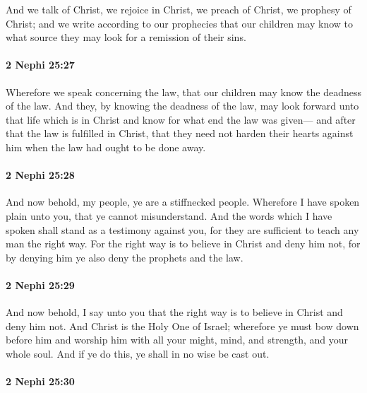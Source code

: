			And we talk of Christ,
			we rejoice in Christ,
			we preach of Christ,
			we prophesy of Christ;
			and we write according to our prophecies
			that our children may know to what source they may look
			for a remission of their sins.

		\paragraph{2 Nephi 25:27} %
			\label{2NEPHI-25-27}

			Wherefore we speak concerning the law,
			that our children may know the deadness of the law.
			And they, by knowing the deadness of the law,
			may look forward unto that life which is in Christ
			and know for what end the law was given---
			and after that the law is fulfilled in Christ,
			that they need not harden their hearts against him
			when the law had ought to be done away.

		\paragraph{2 Nephi 25:28} %
			\label{2NEPHI-25-28}

			And now behold, my people, ye are a stiffnecked people.
			Wherefore I have spoken plain unto you,
			that ye cannot misunderstand.
			And the words which I have spoken shall stand as a testimony against you,
			for they are sufficient to teach any man the right way.
			For the right way is to believe in Christ and deny him not,
			for by denying him ye also deny the prophets and the law.

		\paragraph{2 Nephi 25:29} %
			\label{2NEPHI-25-29}

			And now behold, I say unto you
			that the right way is to believe in Christ and deny him not.
			And Christ is the Holy One of Israel;
			wherefore ye must bow down before him
			and worship him with all your might, mind, and strength, and your whole soul.
			And if ye do this, ye shall in no wise be cast out.

		\paragraph{2 Nephi 25:30} %
			\label{2NEPHI-25-30}

